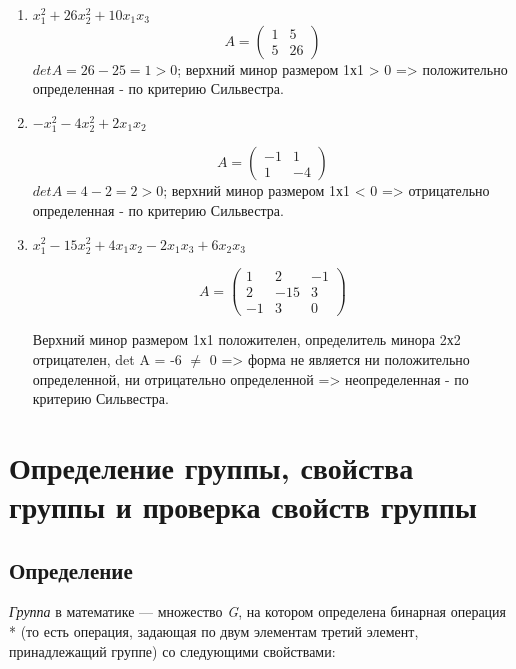 \documentclass[12pt]{article}
\begin{document}
\begin{enumerate}
    \item $x^2_{1} + 26x^2_{2} + 10x_{1}x_{3}$
          \[
              A = \left(
              \begin{array}{rrr}
                      1 & 5  \\
                      5 & 26
                  \end{array}
              \right)
          \]
          $det A = 26 - 25 = 1 > 0$; верхний минор размером 1х1 > 0 => положительно определенная - по критерию Сильвестра.

    \item $-x^2_{1} - 4x^2_{2} + 2x_{1}x_{2}$

          \[
              A = \left(
              \begin{array}{rrr}
                      -1 & 1  \\
                      1  & -4
                  \end{array}
              \right)
          \]
          $det A = 4 - 2 = 2 > 0$; верхний минор размером 1х1 < 0 => отрицательно определенная - по критерию Сильвестра.
    \item $x^2_{1} - 15x^2_{2} + 4x_{1}x_{2} - 2x_{1} x_{3} + 6x_{2} x_{3}$

          \[A = \left(
              \begin{array}{rrr}
                      1  & 2   & -1 \\
                      2  & -15 & 3  \\
                      -1 & 3   & 0
                  \end{array}
              \right)\]

          Верхний минор размером 1х1 положителен, определитель минора 2х2 отрицателен, det A = -6 $\neq$ 0 => форма не является ни положительно определенной, ни отрицательно определенной => неопределенная - по критерию Сильвестра.
\end{enumerate}

\section{Определение группы, свойства группы и проверка свойств группы}

\subsection{Определение}
\emph{Группа} в математике --- множество \emph{G}, на котором определена
бинарная операция * (то есть операция, задающая по двум элементам третий
элемент, принадлежащий группе) со следующими свойствами:
\end{document}
